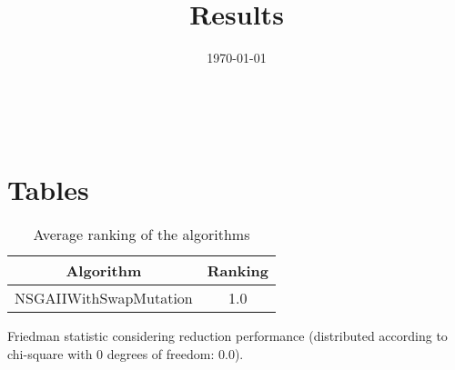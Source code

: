 \documentclass{article}
\title{Results}
\author{}
\date{\today}
\begin{document}
\oddsidemargin 0in \topmargin 0in\maketitle
\
\section{Tables}
\begin{table}[!htp]
\centering
\caption{Average ranking of the algorithms}
\begin{tabular}{c|c}
Algorithm&Ranking\\
\hline
NSGAIIWithSwapMutation&1.0\\
\end{tabular}
\end{table}


Friedman statistic considering reduction performance (distributed according to chi-square with 0 degrees of freedom: 0.0).
\end{document}
